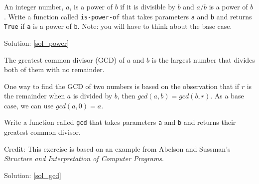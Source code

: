 \begin{exercise}
\label{power}

An integer number, $a$, is a power of $b$ if it is divisible by $b$
and $a/b$ is a power of $b$.  Write a function called
\verb"is-power-of" that takes parameters {\tt a} and {\tt b}
and returns {\tt True} if {\tt a} is a power of {\tt b}.
Note: you will have to think about the base case.

Solution: \ref{sol_power}

\end{exercise}


\begin{exercise}
\label{gcd}

The greatest common divisor (GCD) of $a$ and $b$ is the largest number
that divides both of them with no remainder.  

One way to find the GCD of two numbers is based on the observation
that if $r$ is the remainder when $a$ is divided by $b$, then $gcd(a,
b) = gcd(b, r)$.  As a base case, we can use $gcd(a, 0) = a$.

Write a function called
\verb"gcd" that takes parameters {\tt a} and {\tt b}
and returns their greatest common divisor.

Credit: This exercise is based on an example from Abelson and
Sussman's {\em Structure and Interpretation of Computer Programs}.

Solution: \ref{sol_gcd}

\end{exercise}

